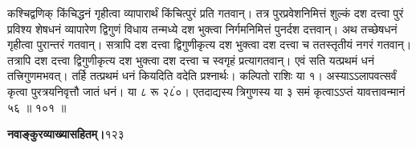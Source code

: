 \documentclass[11pt, openany]{book}
\begin{document}
\begin{sloppypar}
\hangindent=0.2in \hspace{0.2in}कश्चिद्वणिक् किंचिद्धनं गृहीत्वा व्यापारार्थं किंचित्पुरं प्रति गतवान्। तत्र पुरप्रवेशनिमित्तं शुल्कं दश दत्त्वा पुरं प्रविश्य शेषधनं व्यापारेण द्विगुणं विधाय तन्मध्ये दश भुक्त्वा निर्गमनिमित्तं पुनर्दश दत्तवान्। अथ तच्छेषधनं गृहीत्वा पुरान्तरं गतवान्। सत्रापि दश दत्त्वा द्विगुणीकृत्य दश भुक्त्वा दश दत्त्वा च ततस्तृतीयं नगरं गतवान्। तत्रापि दश दत्त्वा द्विगुणीकृत्य दश भुक्त्वा दश दत्त्वा च स्वगृहं प्रत्यागतवान्। एवं सति यत्प्रथमं धनं तत्त्रिगुणमभवत्। तर्हि तत्प्रथमं धनं कियदिति वदेति प्रश्नार्थः। कल्पितो राशिः या १। अस्याऽऽलापवत्सर्वं कृत्वा पुरत्रयनिवृत्तौ जातं धनं। या ८ रू २८ं०। एतदाद्यस्य त्रिगुणस्य या ३ समं कृत्वाऽऽप्तं यावत्तावन्मानं ५६ ॥ १०१ ॥
\end{sloppypar}
\thispagestyle{empty}
\newpage

\onehalfspacing
\hspace{2in}\textbf{नवाङ्कुरव्याख्यासहितम्।}\hspace{2in}१२३

\vspace{5mm}
\end{document}

